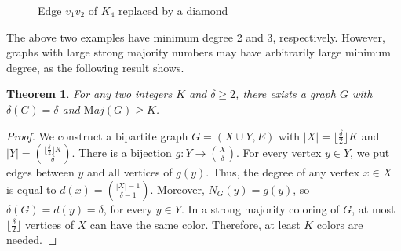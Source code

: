 \documentclass[11pt]{article}
\newtheorem{theorem}{Theorem}
\begin{document}

\begin{figure}[htb]
    \centering
    

    \caption{Edge $v_1v_2$ of $K_4$ replaced by a diamond}
    \label{Kn}
\end{figure}



    





The above two examples have minimum degree 2 and 3, respectively. However, graphs with large strong majority numbers may have arbitrarily large minimum degree, as the following result shows.

\begin{theorem}
For any two integers $K$ and $\delta\ge 2$, there exists a graph $G$ with $\delta(G)=\delta$ and ${\mathrm Maj}(G)\ge K$.
\end{theorem}

\begin {proof}
We construct a bipartite graph  $G = (X \cup Y, E)$  with  $|X| = \lfloor \frac {\delta}{2} \rfloor K$ and  $|Y| = {\lfloor \frac {\delta}{2} \rfloor K \choose \delta}$. There is a bijection $g:Y\rightarrow {X\choose \delta}$. For every vertex $y\in Y$, we put edges between
$y$ and all vertices of $g(y)$. Thus, the degree of any vertex $x\in X$ is equal to $d(x)={|X|-1\choose \delta-1}$. Moreover, $N_G(y)=g(y)$, so $\delta(G)=d(y)=\delta$, for every $y\in Y$.
In a strong majority coloring of $G$, at most $\lfloor \frac{\delta}{2} \rfloor$ vertices of $X$ can have the same color. Therefore, at least $K$ colors are needed. 
\end{proof}
\end{document}
